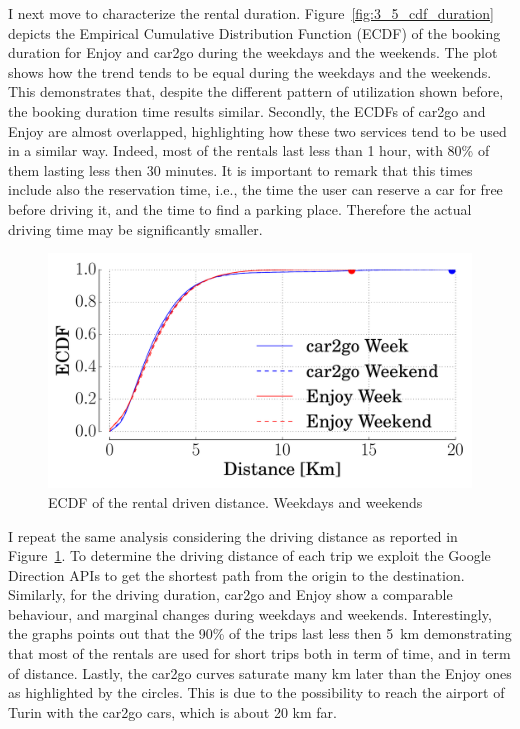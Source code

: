 I next move to characterize the rental duration. Figure~\ref{fig:3_5_cdf_duration} depicts the Empirical Cumulative Distribution Function (ECDF) of the booking duration for Enjoy and car2go during the weekdays and the weekends. The plot shows how the trend tends to be equal during the weekdays and the weekends. This demonstrates that, despite the different pattern of utilization shown before, the booking duration time results similar. Secondly, the ECDFs of car2go and Enjoy are almost overlapped, highlighting how these two services tend to be used in a similar way. Indeed, most of the rentals last less than 1 hour, with 80\% of them lasting less then 30 minutes. It is important to remark that this times include also the reservation time, i.e., the time the user can reserve a car for free before driving it, and the time to find a parking place. Therefore the actual driving time may be significantly smaller.


\begin{figure}
	\centering
	\includegraphics[width=0.85\columnwidth]{figures/distance.pdf}
	\caption{ECDF of the rental driven distance. Weekdays and weekends\label{fig:3_5_cdf_distance}}
\end{figure}


I repeat the same analysis considering the driving distance as reported in Figure~\ref{fig:3_5_cdf_distance}.
To determine the driving distance of each trip we exploit the Google Direction APIs to get the shortest path from the origin to the destination. Similarly, for the driving duration, car2go and Enjoy show a comparable behaviour, and marginal changes during weekdays and weekends. Interestingly, the graphs points out that the 90\% of the trips last less then 5~km demonstrating that most of the rentals are used for short trips both in term of time, and in term of distance. Lastly, the car2go curves saturate many km later than the Enjoy ones as highlighted by the circles. This is due to the possibility to reach the airport of Turin with the car2go cars, which is about 20 km far. 



